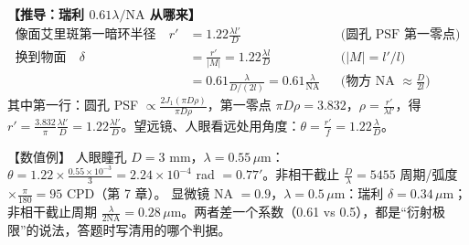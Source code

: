 \textbf{【推导：瑞利 $0.61\lambda/\mathrm{NA}$ 从哪来】}
\begin{align*}
\text{像面艾里斑第一暗环半径}\quad r'&=1.22\frac{\lambda l'}{D} &&\text{(圆孔 PSF 第一零点)}\\
\text{换到物面}\quad\delta&=\frac{r'}{|M|}=1.22\frac{\lambda l}{D} &&\text{($|M|=l'/l$)}\\
&=0.61\frac{\lambda}{D/(2l)}=0.61\frac{\lambda}{\mathrm{NA}} &&\text{(物方 NA $\approx\frac{D}{2l}$)}
\end{align*}
其中第一行：圆孔 PSF $\propto\frac{2J_1(\pi D\rho)}{\pi D\rho}$，第一零点 $\pi D\rho=3.832$，$\rho=\frac{r'}{\lambda l'}$，得 $r'=\frac{3.832}{\pi}\frac{\lambda l'}{D}=1.22\frac{\lambda l'}{D}$。望远镜、人眼看远处用角度：$\theta=\frac{r'}{f}=1.22\frac{\lambda}{D}$。

\begin{exam}{【数值例】}
人眼瞳孔 $D=3$ mm，$\lambda=0.55\,\mu$m：$\theta=1.22\times\frac{0.55\times10^{-3}}{3}=2.24\times10^{-4}$ rad $=0.77'$。非相干截止 $\frac{D}{\lambda}=5455$ 周期/弧度 $\times\frac{\pi}{180}=95$ CPD（第 7 章）。
显微镜 NA $=0.9$，$\lambda=0.5\,\mu$m：瑞利 $\delta=0.34\,\mu$m；非相干截止周期 $\frac{\lambda}{2\mathrm{NA}}=0.28\,\mu$m。两者差一个系数（0.61 vs 0.5），都是“衍射极限”的说法，答题时写清用的哪个判据。
\end{exam}
